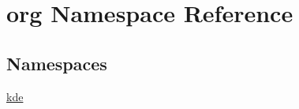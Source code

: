 \hypertarget{namespaceorg}{\section{org Namespace Reference}
\label{namespaceorg}
}
\subsection*{Namespaces}
\begin{DoxyCompactItemize}
\item 
 \hyperlink{namespaceorg_1_1kde}{kde}
\end{DoxyCompactItemize}
